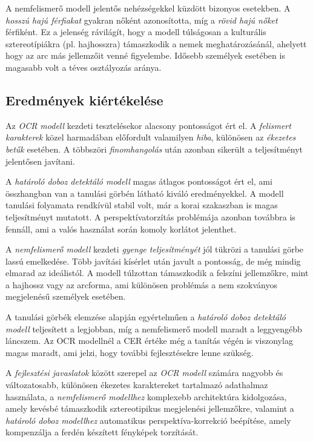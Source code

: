 \documentclass[
]{thesis-ekf}
\theoremstyle{definition}
\theoremstyle{remark}
\begin{document}
A nemfelismerő modell jelentős nehézségekkel küzdött bizonyos esetekben. A \emph{hosszú hajú férfiakat} gyakran nőként azonosította, míg a \emph{rövid hajú nőket} férfiként. Ez a jelenség rávilágít, hogy a modell túlságosan a kulturális sztereotípiákra (pl. hajhosszra) támaszkodik a nemek meghatározásánál, ahelyett hogy az arc más jellemzőit venné figyelembe. Idősebb személyek esetében is magasabb volt a téves osztályozás aránya.

\subsection{Eredmények kiértékelése} Az \emph{OCR modell} kezdeti tesztelésekor alacsony pontosságot ért el. A \emph{felismert karakterek} közel harmadában előfordult valamilyen \emph{hiba}, különösen az \emph{ékezetes betűk} esetében. A többszöri \emph{finomhangolás} után azonban sikerült a teljesítményt jelentősen javítani.

A \emph{határoló doboz detektáló modell} magas átlagos pontosságot ért el, ami összhangban van a tanulási görbén látható kiváló eredményekkel. A modell tanulási folyamata rendkívül stabil volt, már a korai szakaszban is magas teljesítményt mutatott. A perspektívatorzítás problémája azonban továbbra is fennáll, ami a valós használat során komoly korlátot jelenthet.

A \emph{nemfelismerő modell} kezdeti \emph{gyenge teljesítményét} jól tükrözi a tanulási görbe lassú emelkedése. Több javítási kísérlet után javult a pontosság, de még mindig elmarad az ideálistól. A modell túlzottan támaszkodik a felszíni jellemzőkre, mint a hajhossz vagy az arcforma, ami különösen problémás a nem szokványos megjelenésű személyek esetében.

A tanulási görbék elemzése alapján egyértelműen a \emph{határoló doboz detektáló modell} teljesített a legjobban, míg a nemfelismerő modell maradt a leggyengébb láncszem. Az OCR modellnél a CER értéke még a tanítás végén is viszonylag magas maradt, ami jelzi, hogy további fejlesztésekre lenne szükség.

A \emph{fejlesztési javaslatok} között szerepel az \emph{OCR modell} számára nagyobb és változatosabb, különösen ékezetes karaktereket tartalmazó adathalmaz használata, a \emph{nemfelismerő modellhez} komplexebb architektúra kidolgozása, amely kevésbé támaszkodik sztereotipikus megjelenési jellemzőkre, valamint a \emph{határoló doboz modellhez} automatikus perspektíva-korrekció beépítése, amely kompenzálja a ferdén készített fényképek torzítását.
\end{document}
